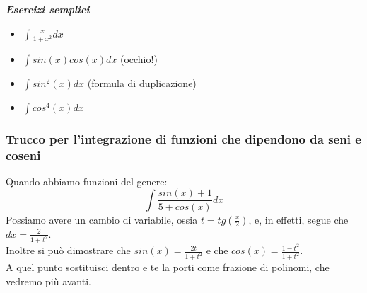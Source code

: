 \documentclass{article}
\theoremstyle{definition}
\begin{document}
\begin{center}
    \textbf{\textit{Esercizi semplici}}
\end{center}
\begin{itemize}
    \item $\int \frac{x}{1+x^2}dx$
    \item $\int sin(x) cos(x) dx$ (occhio!)
    \item $\int sin^2(x) dx$ (formula di duplicazione)
    \item $\int cos^4(x) dx$
\end{itemize}

\subsubsection{Trucco per l'integrazione di funzioni che dipendono da seni e coseni}
Quando abbiamo funzioni del genere:
\begin{equation*}
    \int \frac{sin(x)+1}{5+ cos(x)}dx
\end{equation*}
Possiamo avere un cambio di variabile, ossia $t=tg(\frac{x}{2})$, e, in effetti, segue che $dx=\frac{2}{1+t^2}$.
\\
Inoltre si può dimostrare che $sin(x)=\frac{2t}{1+t^2}$ e che $cos(x)=\frac{1-t^2}{1+t^2}$.
\\
A quel punto sostituisci dentro e te la porti come frazione di polinomi, che vedremo più avanti.
\\
\end{document}

